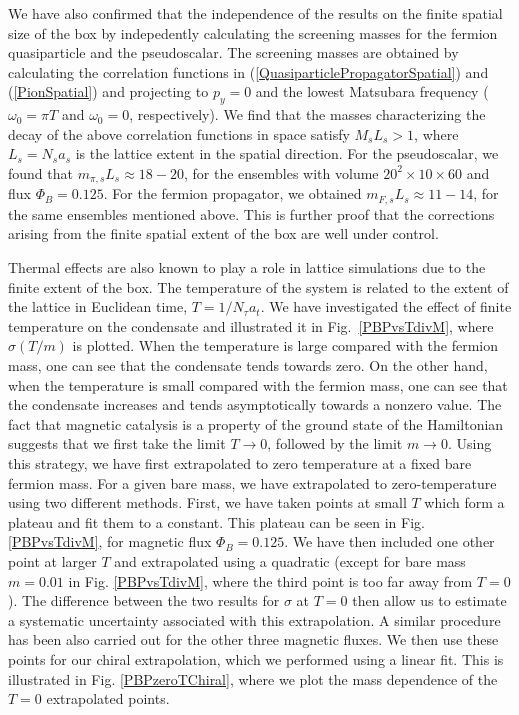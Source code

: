\documentclass[aps,prd,twocolumn,showpacs,superscriptaddress,groupedaddress]{revtex4}  %
\begin{document}
We have also confirmed that the independence of the results on the finite spatial size of the box by indepedently calculating the screening
masses for the fermion quasiparticle and the pseudoscalar. The screening masses are obtained by calculating the correlation functions in (\ref{QuasiparticlePropagatorSpatial}) and (\ref{PionSpatial}) and projecting to $p_y=0$ and the lowest Matsubara frequency ($\omega_0 = \pi T$ and $\omega_0 = 0$, respectively).
We find that the masses characterizing the decay of the above correlation functions in space satisfy $M_s L_s > 1$, where $L_s = N_s a_s$ is the  lattice extent in the spatial direction. For the pseudoscalar, we found that $m_{\pi,s}L_s \approx 18-20$, for the ensembles with volume $20^2\times10\times60$ and flux $\Phi_B=0.125$. For the fermion propagator, we obtained $m_{F,s}L_s \approx 11-14$, for the same ensembles mentioned above. This is further proof that the corrections arising from the finite spatial extent of the box 
are well under control.
 
Thermal effects are also known to play a role in lattice simulations due to the finite extent of the box. The temperature of the system is related to the extent of the lattice in Euclidean time, $T = 1/N_{\tau}a_t$. We have investigated the effect of finite temperature on the condensate and illustrated it in Fig.~\ref{PBPvsTdivM}, where $\sigma(T/m)$ is plotted. When the temperature is large 
compared with the fermion mass, one can see that the condensate tends towards zero. On the other hand, when the temperature is small compared with the fermion mass, one can see that the condensate increases and tends asymptotically towards a nonzero value. The fact that magnetic catalysis is a property of the ground state of the Hamiltonian suggests that we first take the limit $T \to 0$, followed
by the limit $m \to 0$. Using this strategy, we have first extrapolated to zero temperature at a fixed bare fermion mass. For a given bare mass, we have extrapolated to zero-temperature using two different methods. First, we have taken points at small $T$ which form a plateau and fit them to a constant. This plateau can be seen in Fig. \ref{PBPvsTdivM}, for magnetic flux $\Phi_B=0.125$. We have then included one other point at larger $T$ and extrapolated using a quadratic (except for bare mass $m=0.01$ in Fig. \ref{PBPvsTdivM}, where the third point is too far away from $T=0$). The difference between the two results for $\sigma$ at $T=0$ then allow us to estimate a systematic uncertainty associated with this extrapolation. A similar procedure has been also carried out for the other three magnetic fluxes. We then use these points for our chiral extrapolation, which we performed using a linear fit. This is illustrated in Fig. \ref{PBPzeroTChiral}, where we plot the mass dependence of the $T=0$ extrapolated points.
\end{document}
